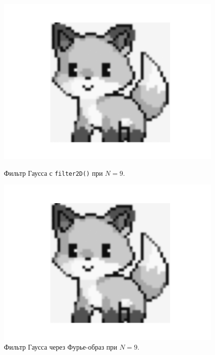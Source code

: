 \documentclass[a4paper]{article}
\begin{document}
\begin{figure}[H]
  \centering
  \begin{minipage}{0.49\textwidth}
    \centering
    \includegraphics[width=\textwidth]{src/gauss_9.png}
    \caption{Фильтр Гаусса с \texttt{filter2D()} при $N=9$.}
  \end{minipage}
  \begin{minipage}{0.49\textwidth}
    \centering
    \includegraphics[width=\textwidth]{src/ifft_gauss_9.png}
    \caption{Фильтр Гаусса через Фурье-образ при $N=9$.}
  \end{minipage}
\end{figure}
\end{document}
